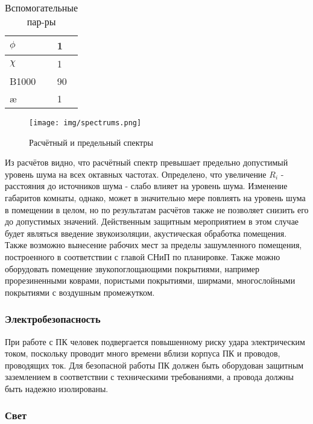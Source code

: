 \documentclass[a4paper,12pt]{report}
\numberwithin{equation}{section}
\begin{document}
\begin{table}
  \centering
  \begin{tabu} {|l|l|}
    \hline
    $\phi$ & 1\\
    \hline
    $\chi$ & 1\\
    \hline
    B1000 & 90\\
    \hline
    \ae & 1\\
    \hline
  \end{tabu}
  \caption{Вспомогательные пар-ры}
  \label{tab:params}
\end{table}

\begin{figure}[h!]
\texttt{[image: img/spectrums.png]}
\caption{Расчётный и предельный спектры}
\label{figure:spectrums}
\end{figure}

\newpage
\clearpage


Из расчётов видно, что расчётный спектр превышает предельно допустимый уровень
шума на всех октавных частотах. Определено, что увеличение $R_i$ - расстояния до
источников шума - слабо влияет на уровень шума. Изменение габаритов комнаты,
однако, может в значительно мере повлиять на уровень шума в помещении в целом,
но по результатам расчётов также не позволяет снизить его до допустимых
значений. Действенным защитным мероприятием в этом случае будет являться
введение звукоизоляции, акустическая обработка помещения. Также возможно
вынесение рабочих мест за пределы зашумленного помещения, построенного в
соответствии с главой СНиП по планировке. Также можно оборудовать помещение
звукопоглощающими покрытиями, например прорезиненными коврами, пористыми
покрытиями, ширмами, многослойными покрытиями с воздушным промежутком.

\subsubsection{Электробезопасность}

При работе с ПК человек подвергается повышенному риску удара электрическим
током, поскольку проводит много времени вблизи корпуса ПК и проводов, проводящих
ток. Для безопасной работы ПК должен быть оборудован защитным заземлением в
соответствии с техническими требованиями, а провода должны быть надежно
изолированы.

\subsubsection{Свет}
\end{document}
